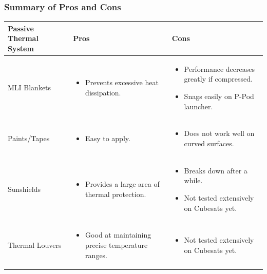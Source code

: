 \documentclass{ece}
\begin{document}
\subsubsection{Summary of Pros and Cons}

\begin{table}[H]
\centering
\begin{tabular}{|p{}|p{}|p{}|} 
\hline
\textbf{Passive Thermal System} & \textbf{Pros} & \textbf{Cons}
\\
\hline
     MLI Blankets
     &
    \begin{itemize}
        \item Prevents excessive heat dissipation.
    \end{itemize}
    &
    \begin{itemize}
        \item Performance decreases greatly if compressed.
        \item Snags easily on P-Pod launcher.
    \end{itemize}
    \\
\hline
     Paints/Tapes
     &
    \begin{itemize}
        \item Easy to apply.
    \end{itemize}
    &
        \begin{itemize}
        \item Does not work well on curved surfaces.
    \end{itemize}
    \\
\hline
    Sunshields
    &
    \begin{itemize}
        \item Provides a large area of thermal protection.
    \end{itemize}
    &
    \begin{itemize}
        \item Breaks down after a while.
        \item Not tested extensively on Cubesats yet.
    \end{itemize}
    \\
\hline
    Thermal Louvers
    &
    \begin{itemize}
        \item Good at maintaining precise temperature ranges.
    \end{itemize}
    &
    \begin{itemize}
        \item Not tested extensively on Cubesats yet.

\end{itemize}
\end{tabular}
\end{table}
\end{document}
